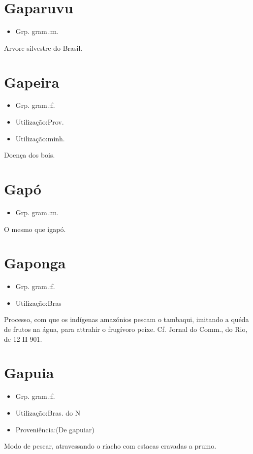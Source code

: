 \section{Gaparuvu}
\begin{itemize}
\item {Grp. gram.:m.}
\end{itemize}
Arvore silvestre do Brasil.
\section{Gapeira}
\begin{itemize}
\item {Grp. gram.:f.}
\end{itemize}
\begin{itemize}
\item {Utilização:Prov.}
\end{itemize}
\begin{itemize}
\item {Utilização:minh.}
\end{itemize}
Doença dos bois.
\section{Gapó}
\begin{itemize}
\item {Grp. gram.:m.}
\end{itemize}
O mesmo que \textunderscore igapó\textunderscore .
\section{Gaponga}
\begin{itemize}
\item {Grp. gram.:f.}
\end{itemize}
\begin{itemize}
\item {Utilização:Bras}
\end{itemize}
Processo, com que os indígenas amazónios pescam o tambaqui, imitando a quéda de frutos na água, para attrahir o frugívoro peixe. Cf. \textunderscore Jornal do Comm.\textunderscore , do Rio, de 12-II-901.
\section{Gapuia}
\begin{itemize}
\item {Grp. gram.:f.}
\end{itemize}
\begin{itemize}
\item {Utilização:Bras. do N}
\end{itemize}
\begin{itemize}
\item {Proveniência:(De \textunderscore gapuiar\textunderscore )}
\end{itemize}
Modo de pescar, atravessando o riacho com estacas cravadas a prumo.
